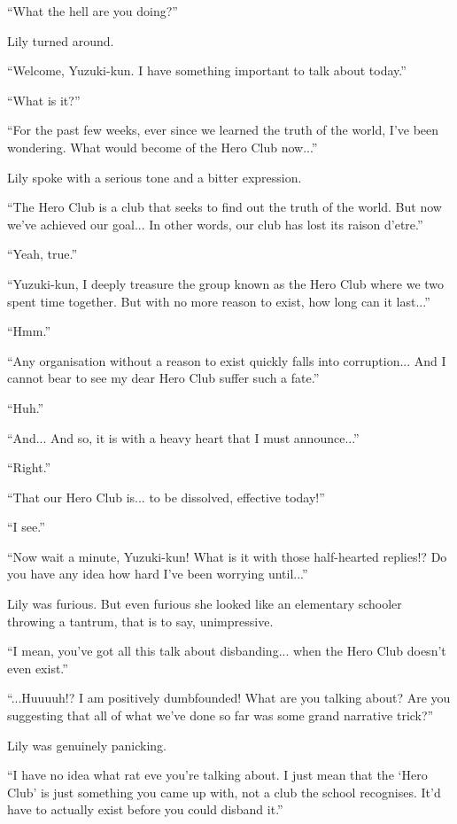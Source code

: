 ``What the hell are you doing?''

Lily turned around.

``Welcome, Yuzuki-kun. I have something important to talk about today.''

``What is it?''

``For the past few weeks, ever since we learned the truth of the world, I've been wondering. What would become of the Hero Club now...''

Lily spoke with a serious tone and a bitter expression.

``The Hero Club is a club that seeks to find out the truth of the world. But now we've achieved our goal... In other words, our club has lost its raison d'etre.''

``Yeah, true.''

``Yuzuki-kun, I deeply treasure the group known as the Hero Club where we two spent time together. But with no more reason to exist, how long can it last...''

``Hmm.''

``Any organisation without a reason to exist quickly falls into corruption... And I cannot bear to see my dear Hero Club suffer such a fate.''

``Huh.''

``And... And so, it is with a heavy heart that I must announce...''

``Right.''

``That our Hero Club is... to be dissolved, effective today!''

``I see.''

``Now wait a minute, Yuzuki-kun! What is it with those half-hearted replies!? Do you have any idea how hard I've been worrying until...''

Lily was furious. But even furious she looked like an elementary schooler throwing a tantrum, that is to say, unimpressive.

``I mean, you've got all this talk about disbanding... when the Hero Club doesn't even exist.''

``...Huuuuh!? I am positively dumbfounded! What are you talking about? Are you suggesting that all of what we've done so far was some grand narrative trick?''

Lily was genuinely panicking.

``I have no idea what rat eve you're talking about. I just mean that the `Hero Club' is just something you came up with, not a club the school recognises. It'd have to actually exist before you could disband it.''

